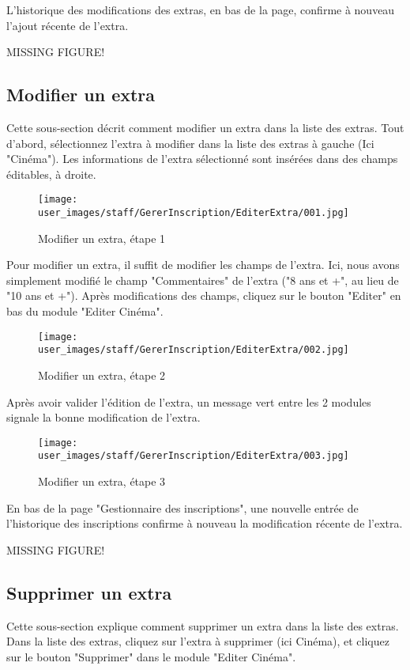 L'historique des modifications des extras, en bas de la page, confirme à nouveau l'ajout récente de l'extra.

MISSING FIGURE!

\subsection{Modifier un extra}

Cette sous-section décrit comment modifier un extra dans la liste des extras. Tout d'abord, sélectionnez l'extra à modifier dans la liste des extras à gauche (Ici "Cinéma"). Les informations de l'extra sélectionné sont insérées dans des champs éditables, à droite.

\begin{figure}[H]
\centering
\texttt{[image: user\_images/staff/GererInscription/EditerExtra/001.jpg]}
\caption{Modifier un extra, étape 1}
\end{figure}

Pour modifier un extra, il suffit de modifier les champs de l'extra. Ici, nous avons simplement modifié le champ "Commentaires" de l'extra ("8 ans et +", au lieu de "10 ans et +"). Après modifications des champs, cliquez sur le bouton "Editer" en bas du module "Editer Cinéma".

\begin{figure}[H]
\centering
\texttt{[image: user\_images/staff/GererInscription/EditerExtra/002.jpg]}
\caption{Modifier un extra, étape 2}
\end{figure}

Après avoir valider l'édition de l'extra, un message vert entre les 2 modules signale la bonne modification de l'extra.

\begin{figure}[H]
\centering
\texttt{[image: user\_images/staff/GererInscription/EditerExtra/003.jpg]}
\caption{Modifier un extra, étape 3}
\end{figure}

En bas de la page "Gestionnaire des inscriptions", une nouvelle entrée de l'historique des inscriptions confirme à nouveau la modification récente de l'extra.

MISSING FIGURE!

\subsection{Supprimer un extra}

Cette sous-section explique comment supprimer un extra dans la liste des extras. Dans la liste des extras, cliquez sur l'extra à supprimer (ici Cinéma), et cliquez sur le bouton "Supprimer" dans le module "Editer Cinéma".

